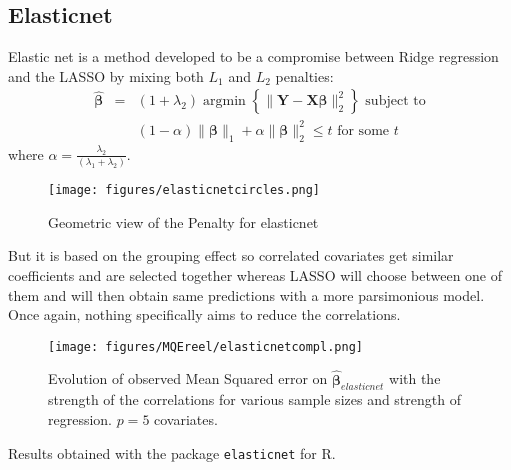 \documentclass[12pt,a4paper]{report}
\begin{document}
	 \FloatBarrier
		\subsection{Elasticnet}		%

			Elastic net \cite{zou2005regularization} is a method developed to be a compromise between Ridge regression and the \textsc{LASSO} by mixing both $L_1$ and $L_2$ penalties: 
	\begin{eqnarray}
		\boldsymbol{\hat{\beta}}&=&(1+\lambda_2) \operatorname{argmin}\left\lbrace \parallel \boldsymbol{Y}-\boldsymbol{X\beta} \parallel_2^2 \right\rbrace \textrm{ subject to} \nonumber \\
			 & &(1-\alpha)\parallel\boldsymbol{\beta}\parallel_1+\alpha\parallel\boldsymbol{\beta}\parallel_2^2\leq t \textrm{ for some } t
	\end{eqnarray}
	where $\alpha=\frac{\lambda_2}{(\lambda_1+\lambda_2)}$. 
	
	
	\begin{figure}[h!]
			\centering
			\texttt{[image: figures/elasticnetcircles.png]} 
			\caption{Geometric view of the Penalty for elasticnet}
		\end{figure}	
	
	But it is based on the grouping effect so correlated covariates get similar coefficients and are selected together whereas LASSO will choose between one of them and will then obtain same predictions with a more parsimonious model. Once again, nothing specifically aims to reduce the correlations. 
	
	 \begin{figure}
	 \centering
	  \texttt{[image: figures/MQEreel/elasticnetcompl.png]}
	  \caption{Evolution of observed Mean Squared error on $\hat{\boldsymbol{\beta}}_{elasticnet}$ with the strength of the correlations for various sample sizes and strength of regression. $p=5$ covariates. } \label{MQEelasticnetcompl}
	\end{figure}
	Results obtained with the package {\tt elasticnet} for R.
		
\end{document}
